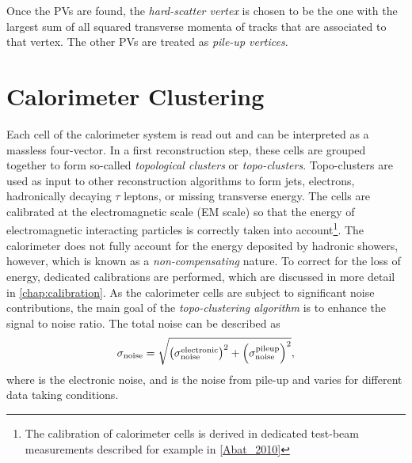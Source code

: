 Once the PVs are found, the \emph{hard-scatter vertex} is chosen to be the one with the largest sum of all squared transverse momenta of tracks that are associated to that vertex. The other PVs are treated as \emph{pile-up vertices}.




\section{Calorimeter Clustering}
Each cell of the calorimeter system is read out and can be interpreted as a massless four-vector. In a first reconstruction step, these cells are grouped together to form so-called \emph{topological clusters} or \emph{topo-clusters}. Topo-clusters are used as input to other reconstruction algorithms to form jets, electrons, hadronically decaying $\tau$ leptons, or missing transverse energy. 
The cells are calibrated at the electromagnetic scale (EM scale) so that the energy of electromagnetic interacting particles is correctly taken into account\footnote{The calibration of calorimeter cells is derived in dedicated test-beam measurements described for example in \cref{Abat_2010}}. The calorimeter does not fully account for the energy deposited by hadronic showers, however, which is known as a \emph{non-compensating} nature.
To correct for the loss of energy, dedicated calibrations are performed, which are discussed in more detail in \cref{chap:calibration}.
As the calorimeter cells are subject to significant noise contributions, the main goal of the \emph{topo-clustering algorithm} is to enhance the signal to noise ratio. The total noise can be described as
\begin{equation}
    \sigma_{\text{noise}} = \sqrt{ \left( \sigma_{\text{noise}}^{\text{electronic}}  \right)^2  + \left( \sigma_{\text{noise}}^{\text{pileup}}  \right)^2 },
\end{equation}
where \electronicnoise is the electronic noise, and \pileupnoise is the noise from pile-up and varies for different data taking conditions. 

